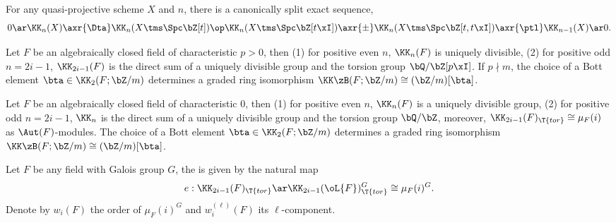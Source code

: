 \documentclass[article, a4paper, twoside]{universal}
\begin{document}
\begin{thm}[\Rnum{5}.8.3]
    For any quasi-projective scheme $X$ and $n$, there is a canonically split exact sequence,
    \[
        0\ar \KK_{n}(X)\axr{\Dta}\KK_{n}(X\tms\Spc\bZ[t])\op \KK_{n}(X\tms\Spc\bZ[t\xI])\axr{\pm} \KK_{n}(X\tms\Spc\bZ[t,t\xI])\axr{\ptl} \KK_{n-1}(X)\ar 0.
    \]
\end{thm}

\begin{thm}[\Rnum{6}.1.3.1]
    Let $F$ be an algebraically closed field of characteristic $p>0$,  then (1) for positive even $n$, $\KK_{n}(F)$ is uniquely divisible, (2) for positive odd $n=2i-1$, $\KK_{2i-1}(F)$ is the direct sum of a uniquely divisible group and the torsion group $\bQ/\bZ[p\xI]$. If $p\nmid m$, the choice of a Bott element $\bta\in \KK_{2}(F;\bZ/m)$ determines a graded ring isomorphism $\KK\zB(F;\bZ/m)\cong(\bZ/m)[\bta]$.
\end{thm}

\begin{thm}
    Let $F$ be an algebraically closed field of characteristic $0$, then (1) for positive even $n$, $\KK_{n}(F)$ is a uniquely divisible group, (2) for positive odd $n=2i-1$, $\KK_{n}$ is the direct sum of a uniquely divisible group and the torsion group $\bQ/\bZ$, moreover, $\KK_{2i-1}(F)_{\T{tor}}\cong\mu_{F}(i)$ as $\Aut(F)$-modules. The choice of a Bott element $\bta\in \KK_{2}(F;\bZ/m)$ determines a graded ring isomorphism $\KK\zB(F;\bZ/m)\cong(\bZ/m)[\bta]$.
\end{thm}

\begin{dfn}[\Rnum{6}.2.1]
    Let $F$ be any field with Galois group $G$, the  is given by the natural map
    \[
        e:\KK_{2i-1}(F)_{\T{tor}}\ar\KK_{2i-1}(\oL{F})_{\T{tor}}^{G}\cong\mu_{F}(i)^{G}.
    \]
    Denote by $w_{i}(F)$ the order of $\mu_{F}(i)^{G}$ and $w_{i}^{(\ell)}(F)$ its $\ell$-component.
\end{dfn}
\end{document}
